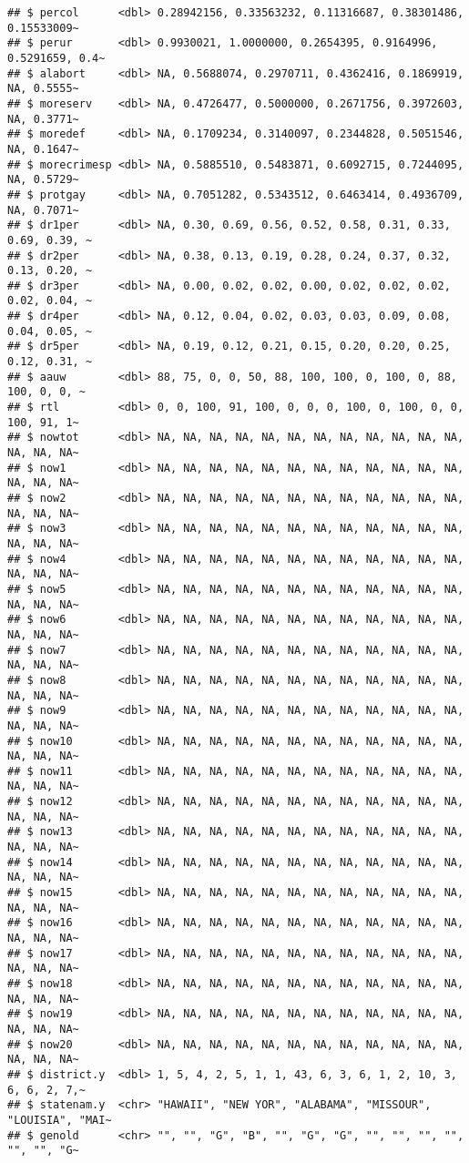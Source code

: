 \documentclass[
]{article}
\begin{document}
\begin{verbatim}
## $ percol      <dbl> 0.28942156, 0.33563232, 0.11316687, 0.38301486, 0.15533009~
## $ perur       <dbl> 0.9930021, 1.0000000, 0.2654395, 0.9164996, 0.5291659, 0.4~
## $ alabort     <dbl> NA, 0.5688074, 0.2970711, 0.4362416, 0.1869919, NA, 0.5555~
## $ moreserv    <dbl> NA, 0.4726477, 0.5000000, 0.2671756, 0.3972603, NA, 0.3771~
## $ moredef     <dbl> NA, 0.1709234, 0.3140097, 0.2344828, 0.5051546, NA, 0.1647~
## $ morecrimesp <dbl> NA, 0.5885510, 0.5483871, 0.6092715, 0.7244095, NA, 0.5729~
## $ protgay     <dbl> NA, 0.7051282, 0.5343512, 0.6463414, 0.4936709, NA, 0.7071~
## $ dr1per      <dbl> NA, 0.30, 0.69, 0.56, 0.52, 0.58, 0.31, 0.33, 0.69, 0.39, ~
## $ dr2per      <dbl> NA, 0.38, 0.13, 0.19, 0.28, 0.24, 0.37, 0.32, 0.13, 0.20, ~
## $ dr3per      <dbl> NA, 0.00, 0.02, 0.02, 0.00, 0.02, 0.02, 0.02, 0.02, 0.04, ~
## $ dr4per      <dbl> NA, 0.12, 0.04, 0.02, 0.03, 0.03, 0.09, 0.08, 0.04, 0.05, ~
## $ dr5per      <dbl> NA, 0.19, 0.12, 0.21, 0.15, 0.20, 0.20, 0.25, 0.12, 0.31, ~
## $ aauw        <dbl> 88, 75, 0, 0, 50, 88, 100, 100, 0, 100, 0, 88, 100, 0, 0, ~
## $ rtl         <dbl> 0, 0, 100, 91, 100, 0, 0, 0, 100, 0, 100, 0, 0, 100, 91, 1~
## $ nowtot      <dbl> NA, NA, NA, NA, NA, NA, NA, NA, NA, NA, NA, NA, NA, NA, NA~
## $ now1        <dbl> NA, NA, NA, NA, NA, NA, NA, NA, NA, NA, NA, NA, NA, NA, NA~
## $ now2        <dbl> NA, NA, NA, NA, NA, NA, NA, NA, NA, NA, NA, NA, NA, NA, NA~
## $ now3        <dbl> NA, NA, NA, NA, NA, NA, NA, NA, NA, NA, NA, NA, NA, NA, NA~
## $ now4        <dbl> NA, NA, NA, NA, NA, NA, NA, NA, NA, NA, NA, NA, NA, NA, NA~
## $ now5        <dbl> NA, NA, NA, NA, NA, NA, NA, NA, NA, NA, NA, NA, NA, NA, NA~
## $ now6        <dbl> NA, NA, NA, NA, NA, NA, NA, NA, NA, NA, NA, NA, NA, NA, NA~
## $ now7        <dbl> NA, NA, NA, NA, NA, NA, NA, NA, NA, NA, NA, NA, NA, NA, NA~
## $ now8        <dbl> NA, NA, NA, NA, NA, NA, NA, NA, NA, NA, NA, NA, NA, NA, NA~
## $ now9        <dbl> NA, NA, NA, NA, NA, NA, NA, NA, NA, NA, NA, NA, NA, NA, NA~
## $ now10       <dbl> NA, NA, NA, NA, NA, NA, NA, NA, NA, NA, NA, NA, NA, NA, NA~
## $ now11       <dbl> NA, NA, NA, NA, NA, NA, NA, NA, NA, NA, NA, NA, NA, NA, NA~
## $ now12       <dbl> NA, NA, NA, NA, NA, NA, NA, NA, NA, NA, NA, NA, NA, NA, NA~
## $ now13       <dbl> NA, NA, NA, NA, NA, NA, NA, NA, NA, NA, NA, NA, NA, NA, NA~
## $ now14       <dbl> NA, NA, NA, NA, NA, NA, NA, NA, NA, NA, NA, NA, NA, NA, NA~
## $ now15       <dbl> NA, NA, NA, NA, NA, NA, NA, NA, NA, NA, NA, NA, NA, NA, NA~
## $ now16       <dbl> NA, NA, NA, NA, NA, NA, NA, NA, NA, NA, NA, NA, NA, NA, NA~
## $ now17       <dbl> NA, NA, NA, NA, NA, NA, NA, NA, NA, NA, NA, NA, NA, NA, NA~
## $ now18       <dbl> NA, NA, NA, NA, NA, NA, NA, NA, NA, NA, NA, NA, NA, NA, NA~
## $ now19       <dbl> NA, NA, NA, NA, NA, NA, NA, NA, NA, NA, NA, NA, NA, NA, NA~
## $ now20       <dbl> NA, NA, NA, NA, NA, NA, NA, NA, NA, NA, NA, NA, NA, NA, NA~
## $ district.y  <dbl> 1, 5, 4, 2, 5, 1, 1, 43, 6, 3, 6, 1, 2, 10, 3, 6, 6, 2, 7,~
## $ statenam.y  <chr> "HAWAII", "NEW YOR", "ALABAMA", "MISSOUR", "LOUISIA", "MAI~
## $ genold      <chr> "", "", "G", "B", "", "G", "G", "", "", "", "", "", "", "G~
\end{verbatim}
\end{document}
